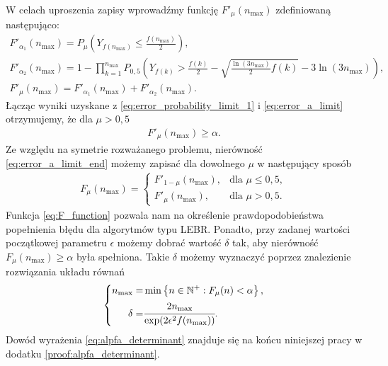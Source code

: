 \documentclass[inzynierska]{pwr_wmat_praca_dyplomowa}
\theoremstyle{plain}
\numberwithin{theorem}{chapter}
\theoremstyle{definition}
\numberwithin{theorem}{chapter}
\newcommand{\nmax}{n_{\text{max}}}
\begin{document}
	W celach uproszenia zapisy wprowadźmy funkcję  $F'_{\mu}(\nmax)$ zdefiniowaną następująco:
	\begin{gather}
		F'_{\alpha_1}(\nmax) = P_{\mu}\left( Y_{f(\nmax)}  \le \frac{f(\nmax)}{2} \right),\nonumber \\
		F'_{\alpha_2}(\nmax) = 1 - \prod_{k=1}^{\nmax} P_{0,5}\left( Y_{f(k)}  > \frac{f(k)}{2} - \sqrt{\frac{\ln(3\nmax)}{2}f(k)} - 3  \ln{(3 \nmax)}\right),\nonumber \\
		\label{eq:error_a_limit}
		F'_{\mu}(\nmax) =  F'_{\alpha_1}(\nmax)+F'_{\alpha_2}(\nmax).
	\end{gather}
		Łącząc wyniki uzyskane z
		\eqref{eq:error_probability_limit_1} i \eqref{eq:error_a_limit} otrzymujemy, że dla $\mu > 0,5$
	\begin{gather}
		\label{eq:error_a_limit_end}
		F'_{\mu}(\nmax) \ge \alpha .
	\end{gather}
		Ze względu na symetrie rozważanego problemu, nierówność \eqref{eq:error_a_limit_end} możemy zapisać dla dowolnego $\mu$ w następujący sposób
	\begin{align}
		\label{eq:F_function}
		F_{\mu}(\nmax) = 
		\begin{cases}
			F'_{1-\mu}(\nmax), &\text{dla }  \mu\le0,5,\\
			F'_{\mu}(\nmax), &\text{dla } \mu>0,5.
		\end{cases}
	\end{align}
	\noindent
	Funkcja \eqref{eq:F_function} pozwala nam na określenie prawdopodobieństwa popełnienia błędu dla algorytmów typu LEBR. Ponadto, przy zadanej wartości początkowej parametru $\epsilon$ możemy dobrać wartość $\delta$ tak, aby nierówność $F_{\mu}(\nmax) \ge \alpha$ była spełniona. Takie $\delta$ możemy wyznaczyć poprzez znalezienie rozwiązania układu równań
	\begin{gather}
		\label{eq:alpfa_determinant}
		\left\{
		\begin{split}
			\nmax =& \min \left\{n\in \mathbb{N}^+: F_{\mu}(n) < \alpha \right\}, \\
			\delta =&\cfrac{2\nmax}{\exp(2\epsilon^2f(\nmax))}.
		\end{split}
		\right. 
	\end{gather}
	Dowód wyrażenia \eqref{eq:alpfa_determinant} znajduje się na końcu niniejszej pracy w dodatku \ref{proof:alpfa_determinant}.
	
\end{document}
